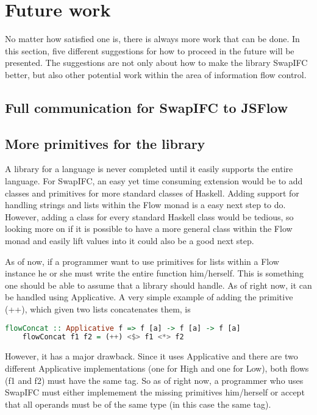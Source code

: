 \chapter{Future work}
No matter how satisfied one is, there is always more work that can be done. In this section, five different suggestions for how to proceed in the future will be presented. The suggestions are not only about how to make the library SwapIFC better, but also other potential work within the area of information flow control.

\section{Full communication for SwapIFC to JSFlow}

\section{More primitives for the library}
A library for a language is never completed until it easily supports the entire language. For SwapIFC, an easy yet time consuming extension would be to add classes and primitives for more standard classes of Haskell. Adding support for handling strings and lists within the Flow monad is a easy next step to do. However, adding a class for every standard Haskell class would be tedious, so looking more on if it is possible to have a more general class within the Flow monad and easily lift values into it could also be a good next step.

As of now, if a programmer want to use primitives for lists within a Flow instance he or she must write the entire function him/herself. This is something one should be able to assume that a library should handle. As of right now, it can be handled using Applicative. A very simple example of adding the primitive (++), which given two lists concatenates them, is
\begin{center}
  \begin{lstlisting}[language=Haskell]
    flowConcat :: Applicative f => f [a] -> f [a] -> f [a]
    flowConcat f1 f2 = (++) <$> f1 <*> f2
  \end{lstlisting}
\end{center}
However, it has a major drawback. Since it uses Applicative and there are two different Applicative implementations (one for High and one for Low), both flows (f1 and f2) must have the same tag. So as of right now, a programmer who uses SwapIFC must either implemement the missing primitives him/herself or accept that all operands must be of the same type (in this case the same tag).

